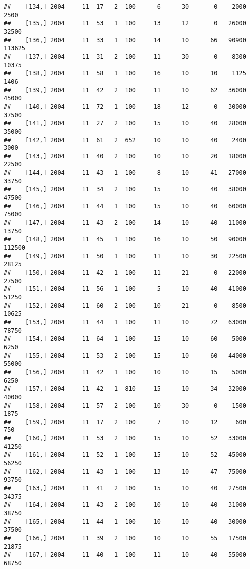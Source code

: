 \documentclass{article}\usepackage[]{graphicx}\usepackage[]{color}
\makeatletter
\newenvironment{kframe}{%
 \def\at@end@of@kframe{}%
 \ifinner\ifhmode%
  \def\at@end@of@kframe{\end{minipage}}%
  \begin{minipage}{\columnwidth}%
 \fi\fi%
 \def\FrameCommand##1{\hskip\@totalleftmargin \hskip-\fboxsep
 \colorbox{shadecolor}{##1}\hskip-\fboxsep
     \hskip-\linewidth \hskip-\@totalleftmargin \hskip\columnwidth}%
 \MakeFramed {\advance\hsize-\width
   \@totalleftmargin\z@ \linewidth\hsize
   \@setminipage}}%
 {\par\unskip\endMakeFramed%
 \at@end@of@kframe}
\newenvironment{knitrout}{}{} %
\makeatother
\begin{document}
\begin{knitrout}
\begin{kframe}
\begin{verbatim}
##    [134,] 2004     11  17   2  100      6      30       0    2000    2500
##    [135,] 2004     11  53   1  100     13      12       0   26000   32500
##    [136,] 2004     11  33   1  100     14      10      66   90900  113625
##    [137,] 2004     11  31   2  100     11      30       0    8300   10375
##    [138,] 2004     11  58   1  100     16      10      10    1125    1406
##    [139,] 2004     11  42   2  100     11      10      62   36000   45000
##    [140,] 2004     11  72   1  100     18      12       0   30000   37500
##    [141,] 2004     11  27   2  100     15      10      40   28000   35000
##    [142,] 2004     11  61   2  652     10      10      40    2400    3000
##    [143,] 2004     11  40   2  100     10      10      20   18000   22500
##    [144,] 2004     11  43   1  100      8      10      41   27000   33750
##    [145,] 2004     11  34   2  100     15      10      40   38000   47500
##    [146,] 2004     11  44   1  100     15      10      40   60000   75000
##    [147,] 2004     11  43   2  100     14      10      40   11000   13750
##    [148,] 2004     11  45   1  100     16      10      50   90000  112500
##    [149,] 2004     11  50   1  100     11      10      30   22500   28125
##    [150,] 2004     11  42   1  100     11      21       0   22000   27500
##    [151,] 2004     11  56   1  100      5      10      40   41000   51250
##    [152,] 2004     11  60   2  100     10      21       0    8500   10625
##    [153,] 2004     11  44   1  100     11      10      72   63000   78750
##    [154,] 2004     11  64   1  100     15      10      60    5000    6250
##    [155,] 2004     11  53   2  100     15      10      60   44000   55000
##    [156,] 2004     11  42   1  100     10      10      15    5000    6250
##    [157,] 2004     11  42   1  810     15      10      34   32000   40000
##    [158,] 2004     11  57   2  100     10      30       0    1500    1875
##    [159,] 2004     11  17   2  100      7      10      12     600     750
##    [160,] 2004     11  53   2  100     15      10      52   33000   41250
##    [161,] 2004     11  52   1  100     15      10      52   45000   56250
##    [162,] 2004     11  43   1  100     13      10      47   75000   93750
##    [163,] 2004     11  41   2  100     15      10      40   27500   34375
##    [164,] 2004     11  43   2  100     10      10      40   31000   38750
##    [165,] 2004     11  44   1  100     10      10      40   30000   37500
##    [166,] 2004     11  39   2  100     10      10      55   17500   21875
##    [167,] 2004     11  40   1  100     11      10      40   55000   68750

\end{verbatim}
\end{kframe}
\end{knitrout}
\end{document}
